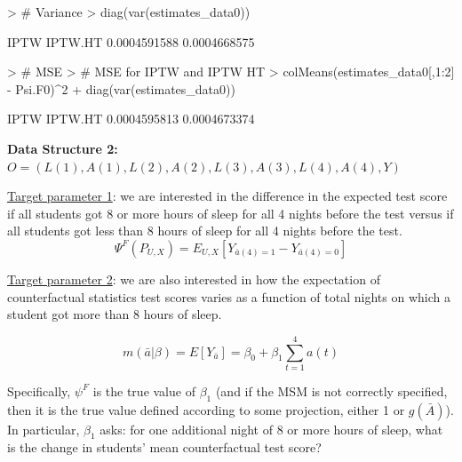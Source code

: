 \documentclass{exam}
\begin{document}
\begin{solution}
\begin{Schunk}
\begin{Sinput}
> # Variance
> diag(var(estimates_data0))
\end{Sinput}
\begin{Soutput}
        IPTW      IPTW.HT 
0.0004591588 0.0004668575 
\end{Soutput}
\end{Schunk}
\begin{Schunk}
\begin{Sinput}
> # MSE
> # MSE for IPTW and IPTW HT
> colMeans(estimates_data0[,1:2] - Psi.F0)^2 + diag(var(estimates_data0))
\end{Sinput}
\begin{Soutput}
        IPTW      IPTW.HT 
0.0004595813 0.0004673374 
\end{Soutput}
\end{Schunk}

\end{solution}


\pagebreak
\noindent\large\textbf{Data Structure 2: $O = (L(1), A(1), L(2), A(2), L(3), A(3), L(4), A(4), Y)$}
\normalsize

\noindent\underline{Target parameter 1}: we are interested in the difference in the expected test score if all students got 8 or more hours of sleep for all 4 nights before the test versus if all students got less than 8 hours of sleep for all 4 nights before the test.
\[
\Psi^F(P_{U,X}) = E_{U,X}[Y_{\bar{a}(4)=1} - Y_{\bar{a}(4)=0}]
\]

\noindent\underline{Target parameter 2}: we are also interested in how the expectation of counterfactual statistics test scores varies as a function of total nights on which a student got more than 8 hours of sleep. 

\[
m(\bar{a}|\beta) = E[Y_{\bar{a}}] = \beta_0 + \beta_1 \sum_{t=1}^4a(t)
\]

Specifically, $\psi^F$ is the true value of $\beta_1$ (and if the MSM is not correctly specified, then it is the true value defined according to some projection, either 1 or $g(\bar{A})$). In particular, $\beta_1$ asks: for one additional night of 8 or more hours of sleep, what is the change in students' mean counterfactual test score?
\end{document}
